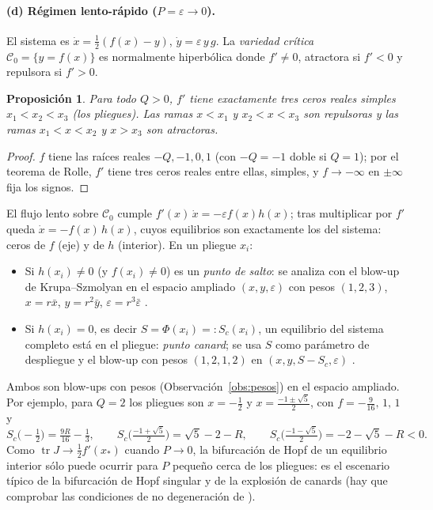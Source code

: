 \documentclass[11pt,a4paper]{article}
\newcommand{\tr}{\operatorname{tr}}
\theoremstyle{plain}
\newtheorem{proposicion}[teorema]{Proposición}
\theoremstyle{definition}
\theoremstyle{remark}
\begin{document}
\paragraph{(d) Régimen lento-rápido ($P=\varepsilon\to0$).} El sistema es $\dot x=\tfrac12(f(x)-y)$, $\dot y=\varepsilon\,y\,g$. La \emph{variedad crítica} $\mathcal C_0=\{y=f(x)\}$ es normalmente hiperbólica donde $f'\neq0$, atractora si $f'<0$ y repulsora si $f'>0$.

\begin{proposicion}\label{prop:pliegues}
Para todo $Q>0$, $f'$ tiene exactamente tres ceros reales simples $x_1<x_2<x_3$ (los \emph{pliegues}). Las ramas $x<x_1$ y $x_2<x<x_3$ son repulsoras y las ramas $x_1<x<x_2$ y $x>x_3$ son atractoras.
\end{proposicion}

\begin{proof}
$f$ tiene las raíces reales $-Q,-1,0,1$ (con $-Q=-1$ doble si $Q=1$); por el teorema de Rolle, $f'$ tiene tres ceros reales entre ellas, simples, y $f\to-\infty$ en $\pm\infty$ fija los signos.
\end{proof}

El flujo lento sobre $\mathcal C_0$ cumple $f'(x)\,\dot x=-\varepsilon f(x)h(x)$; tras multiplicar por $f'$ queda $\dot x=-f(x)\,h(x)$, cuyos equilibrios son exactamente los del sistema: ceros de $f$ (eje) y de $h$ (interior). En un pliegue $x_i$:
\begin{itemize}
\item Si $h(x_i)\neq0$ (y $f(x_i)\ne0$) es un \emph{punto de salto}: se analiza con el blow-up de Krupa--Szmolyan en el espacio ampliado $(x,y,\varepsilon)$ con pesos $(1,2,3)$, $x=r\bar x$, $y=r^2\bar y$, $\varepsilon=r^3\bar\varepsilon$ \cite{KS}.
\item Si $h(x_i)=0$, es decir $S=\Phi(x_i)=:S_c(x_i)$, un equilibrio del sistema completo está en el pliegue: \emph{punto canard}; se usa $S$ como parámetro de despliegue y el blow-up con pesos $(1,2,1,2)$ en $(x,y,S-S_c,\varepsilon)$ \cite{KS}.
\end{itemize}
Ambos son blow-ups con pesos (Observación~\ref{obs:pesos}) en el espacio ampliado. Por ejemplo, para $Q=2$ los pliegues son $x=-\tfrac12$ y $x=\tfrac{-1\pm\sqrt5}2$, con $f=-\tfrac9{16},\,1,\,1$ y
\[
S_c\big(-\tfrac12\big)=\tfrac{9R}{16}-\tfrac13,\qquad
S_c\big(\tfrac{-1+\sqrt5}2\big)=\sqrt5-2-R,\qquad
S_c\big(\tfrac{-1-\sqrt5}2\big)=-2-\sqrt5-R<0.
\]
Como $\tr J\to\tfrac12f'(x_*)$ cuando $P\to0$, la bifurcación de Hopf de un equilibrio interior sólo puede ocurrir para $P$ pequeño cerca de los pliegues: es el escenario típico de la bifurcación de Hopf singular y de la explosión de canards (hay que comprobar las condiciones de no degeneración de \cite{KS}).
\end{document}

